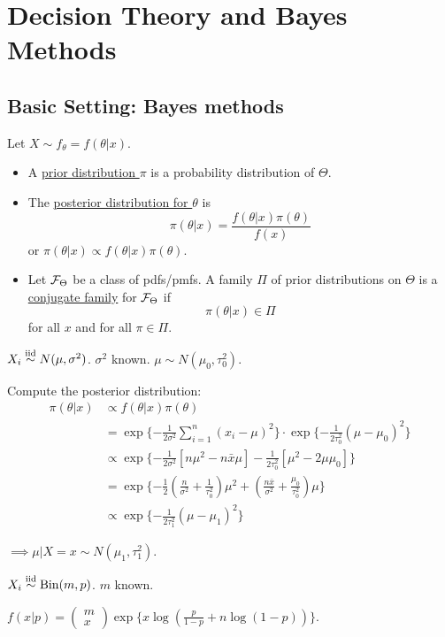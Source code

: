 \section{Decision Theory and Bayes Methods}

\subsection{Basic Setting: Bayes methods}
\begin{mydef} Let $X \sim f_\theta = f(\theta| x)$.
	\begin{itemize}
		\item 
		A \uline{prior distribution $\pi$} is a probability distribution of $\Theta$.
		
		\item 
		The \uline{posterior distribution for $\theta$} is 
		$$\pi(\theta |x) = \frac{ f(\theta | x) \pi(\theta) }{ f(x) }$$
		or $\pi(\theta | x) \propto f(\theta| x) \pi(\theta)$.
		
		\item 
		Let $\mathcal{F}_\Theta$ be a class of pdfs/pmfs. A family $\Pi$ of prior distributions on $\Theta$ is a \uline{conjugate family} for $\mathcal{F}_\Theta$ if $$\pi(\theta|x) \in \Pi$$ for all $x$ and for all $\pi \in \Pi$.
	\end{itemize}
\end{mydef}

\begin{exap}
	$X_i \stackrel{\text{iid}}{\sim} N(\mu,\sigma^2)$. $\sigma^2$ known. $\mu \sim N(\mu_0, \tau^2_0)$.
	
	Compute the posterior distribution:
	\begin{align*}
		\pi(\theta | x) &\propto f(\theta| x) \pi(\theta) \\
		&= \exp\{ -\frac{1}{2\sigma^2} \sum^n_{i=1}(x_i -\mu)^2  \} \cdot \exp\{ -\frac{1}{2\tau_0^2} (\mu - \mu_0)^2 \}\\
		&\propto \exp\{ -\frac{1}{2\sigma^2} [ n \mu^2 - n\bar{x}\mu ]  -\frac{1}{2\tau_0^2} [\mu^2 - 2\mu \mu_0] \} \\
		&= \exp\{ -\frac{1}{2}( \frac{n}{\sigma^2}+ \frac{1}{\tau_0^2} ) \mu^2 + ( \frac{n\bar{x}}{\sigma^2} + \frac{\mu_0}{\tau^2_0} )\mu \} \\
		&\propto \exp\{ -\frac{1}{2\tau^2_1} (\mu - \mu_1)^2 \}
	\end{align*}
	
	$\implies \mu|X=x \sim N(\mu_1, \tau_1^2)$.
\end{exap} 

\begin{exap}
	$X_i \stackrel{\text{iid}}{\sim} \mathrm{Bin}(m,p)$. $m$ known. 
	
	$f(x|p) = \begin{pmatrix}
	m \\
	x
	\end{pmatrix} \exp\{ x\log( \frac{p}{1-p} +n\log(1-p)) \}$.
\end{exap}

